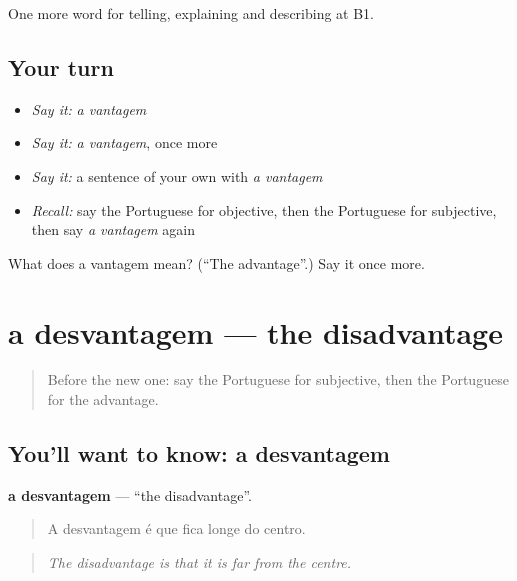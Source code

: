 \begin{grammarlens}[title={What you've built}]
One more word for telling, explaining and describing at B1.
\end{grammarlens}

\subsection*{Your turn}
\begin{itemize}
\raggedright
  \item \emph{Say it:} \emph{a vantagem}
  \item \emph{Say it:} \emph{a vantagem}, once more
  \item \emph{Say it:} a sentence of your own with \emph{a vantagem}
  \item \emph{Recall:} say the Portuguese for objective, then the Portuguese for subjective, then say \emph{a vantagem} again
\end{itemize}

\begin{tcolorbox}[breakable,colback=teal!4,colframe=teal!35!black,title={Before you move on}]
What does a vantagem mean? (\textquotedblleft{}The advantage\textquotedblright{}.) Say it once more.
\end{tcolorbox}
\section[a desvantagem]{a desvantagem — the disadvantage}

\label{lesson:PT-C345-desvantagem}



\begin{quote}
Before the new one: say the Portuguese for subjective, then the Portuguese for the advantage.
\end{quote}

\subsection*{You'll want to know: a desvantagem}
\textbf{a desvantagem} — \textquotedblleft{}the disadvantage\textquotedblright{}.

\begin{quote}
A desvantagem é que fica longe do centro.
\end{quote}

\begin{quote}
\emph{The disadvantage is that it is far from the centre.}
\end{quote}

